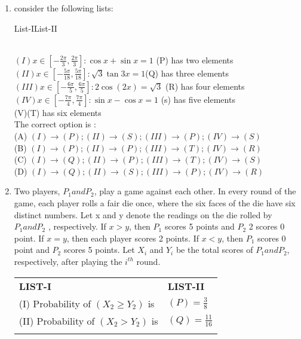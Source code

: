 \documentclass{article}
\begin{document}
\begin{enumerate}
	\item consider the following lists:\\
		\centerline{List-I\qquad\qquad\qquad \qquad\qquad\qquad List-II}\\
	$(I){ x \in [ -\frac{2\pi}{3}, \frac{2\pi}{3} ] : \cos x + \sin x = 1 }$ \qquad(P) has two elements\\
	$(II){ x \in [ -\frac{5\pi}{18}, \frac{5\pi}{18} ] : \sqrt{3} \tan 3x = 1 }$\quad \qquad(Q) has three elements \\
        $(III){ x \in [ -\frac{6\pi}{5}, \frac{6\pi}{5} ] : 2 \cos (2x) = \sqrt{3} }$ \qquad(R) has four elements \\
	$(IV){ x \in [ -\frac{7\pi}{4}, \frac{7\pi}{4} ] : \sin x - \cos x = 1 }$ \qquad(s) has five elements\\
	 (V)\qquad\qquad\qquad\qquad\qquad\qquad\qquad\qquad\quad (T) has six elements\\
\medskip
  The correct option is :\\
 (A) $(I)\to(P);(II)\to(S);(III)\to(P);(IV)\to(S)$\\
 (B) $(I)\to(P);(II)\to(P);(III)\to(T);(IV)\to(R)$\\
 (C) $(I)\to(Q);(II)\to(P);(III)\to(T);(IV)\to(S)$\\
 (D) $(I)\to(Q);(II)\to(S);(III)\to(P);(IV)\to(R)$
\\
\medskip
	\item Two players, $P_1 and P_2$, play a game against each other. In every round of the game, each player rolls 
a fair die once, where the six faces of the die have six distinct numbers. Let x and y denote the readings on the die rolled by $P_1 and P_2$ , respectively. If $x > y$, then $P_1$ scores 5 points and $P_2$ 2 scores 0 point. If $x = y$, then each player scores 2 points. If $x < y$, then $P_1$ scores 0 point and $P_2$ scores 5 points. Let $X_i$ and $Y_i$ be the total scores of $P_1 and P_2$, respectively, after playing the $i^{th}$ round.
\\
 \begin{center}
\begin{tabular}{l l}
    \textbf{LIST-I} & \textbf{LIST-II} \\
	(I) Probability of $ (X_2 \geq Y_2 )$ is &  $(P) = \frac{3}{8} $\\                                                             \medskip
	(II) Probability of $(X_2 > Y_2 )$ is &\( (Q) = \frac{11}{16} \)\\                                                             \medskip

\end{tabular}
\end{center}
\end{enumerate}
\end{document}
